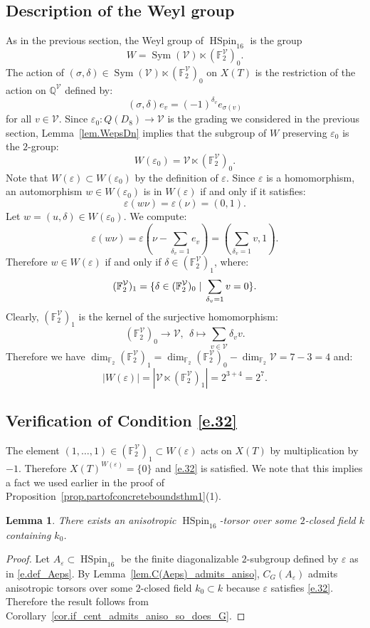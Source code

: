 \documentclass[12pt]{amsart}
\numberwithin{equation}{section}
\newtheorem{lemma}[theorem]{Lemma}
\theoremstyle{definition}
\newcommand{\cV}{\mathcal{V}}
\newcommand{\bF}{\mathbb{F}}
\newcommand{\bQ}{\mathbb{Q}}
\newcommand{\Sym}{\operatorname{Sym}}
\newcommand{\eps}{\varepsilon}
\newcommand{\HSpin}{\operatorname{HSpin}}
\begin{document}
\subsection*{Description of the Weyl group}
As in the previous section, the Weyl group of $\HSpin_{16}$ is the group
$$W = \Sym(\cV)\ltimes (\bF_2^{\cV})_0.$$
The action of $(\sigma,\delta)\in\Sym(\cV)\ltimes (\bF_2^{\cV})_0$ on $X(T)$ is the restriction of the action on $\bQ^\cV$ defined by:
\begin{equation}\label{e.act_W(eps)_HSpin}
(\sigma,\delta)e_v = (-1)^{\delta_v} e_{\sigma(v)}
\end{equation}
for all $v\in \cV$. Since $\eps_0:Q(D_8)\to \cV$ is the grading we considered in the previous section,  Lemma~\ref{lem.WepsDn} implies that the subgroup of $W$ preserving $\eps_0$ is the $2$-group:
$$W(\eps_0) = \cV \ltimes (\bF_2^{\cV})_0.$$
Note that $W(\eps) \subset W(\eps_0)$ by the definition of $\eps$. Since $\eps$ is a homomorphism, an automorphism $w\in W(\eps_0)$ is in $W(\eps)$ if and only if it satisfies:
$$\eps(w\nu)=\eps(\nu)=(0,1).  $$
Let $w = (u,\delta) \in W(\eps_0)$. We compute:
$$\eps(w \nu) = \eps(\nu - \sum_{\delta_v =1} e_v) = (\sum_{\delta_v =1} v, 1).$$
Therefore $w\in W(\eps)$  if and only if $\delta \in (\bF_2^\cV)_1$, where:
$$(\bF_2^\cV)_1 = \{ \delta \in (\bF^\cV_2)_0 \mid \\
    \sum_{\delta_v =1} v= 0
\}.$$
Clearly, $(\bF_2^\cV)_1$ is the kernel of the surjective homomorphism:
$$(\bF_2^{\cV})_0 \to \cV ,\ \ \delta \mapsto \sum_{v\in \cV} \delta_v v.$$
Therefore we have $\dim_{\bF_2} (\bF_2^\cV)_1 = \dim_{\bF_2} (\bF_2^\cV)_0- \dim_{\bF_2} \cV =7-3 =4$ and:
$$|W(\eps)| = |\cV\ltimes  (\bF_2^\cV)_1| = 2^{3 +4}=2^{7}.$$


\subsection*{Verification of Condition \eqref{e.32}}
The element $(1,\dots,1) \in (\bF_2^{\cV})_1\subset W(\eps)$ acts on $X(T)$ by multiplication by $-1$. Therefore $X(T)^{W(\eps)}=\{0\}$ and \eqref{e.32} is satisfied. We note that this implies a fact we used earlier in the proof of Proposition~\ref{prop.partofconcreteboundsthm1}(1).

\begin{lemma}\label{lem.HSpin_admits_aniso}
     There exists an anisotropic $\HSpin_{16}$-torsor over some $2$-closed field $k$ containing $k_0$. 
\end{lemma}
\begin{proof}
    Let $A_\eps \subset \HSpin_{16}$ be the finite diagonalizable $2$-subgroup defined by $\eps$ as in \eqref{e.def_Aeps}.
    By Lemma~\ref{lem.C(Aeps)_admits_aniso}, 
    $C_G(A_\eps)$ admits anisotropic torsors over some $2$-closed field $k_0\subset k$ because $\eps$ satisfies \eqref{e.32}. Therefore the result follows from Corollary~\ref{cor.if_cent_admits_aniso_so_does_G}.
\end{proof}
\end{document}
